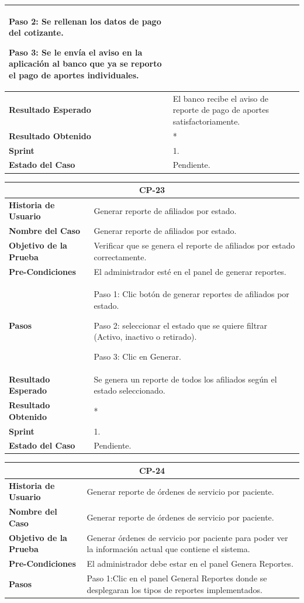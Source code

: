 \documentclass[12pt,a4paper]{article}
\begin{document}
\begin{center}
\begin{tabular}{|m{5cm}|m{9cm}|}
Paso 2: Se rellenan los datos de pago del cotizante.

Paso 3: Se le envía el aviso en la aplicación al banco que ya se reporto el pago de aportes individuales.\\
\hline
\textbf{Resultado Esperado} & El banco recibe el aviso de reporte de pago de aportes satisfactoriamente.\\
\hline
\textbf{Resultado Obtenido} & *\\
\hline
\textbf{Sprint} & 1. \\
\hline
\textbf{Estado del Caso} & Pendiente. \\
\hline
\end{tabular}
\vspace{5mm}

\begin{tabular}{|m{5cm}|m{9cm}|}
\hline
\multicolumn{2}{|c|}{\textbf{CP-23}} \\
\hline
\textbf{Historia de Usuario} & Generar reporte de afiliados por estado.\\
\hline
\textbf{Nombre del Caso} & Generar reporte de afiliados por estado.\\
\hline
\textbf{Objetivo de la Prueba} & Verificar que se genera el reporte de afiliados por estado correctamente.\\
\hline
\textbf{Pre-Condiciones} & El administrador esté en el panel de generar reportes. \\
\hline
\textbf{Pasos} & Paso 1: Clic botón de generar reportes de afiliados por estado.

Paso 2: seleccionar el estado que se quiere filtrar (Activo, inactivo o retirado).

Paso 3: Clic en Generar. \\
\hline
\textbf{Resultado Esperado} & Se genera un reporte de todos los afiliados según el estado seleccionado.\\
\hline
\textbf{Resultado Obtenido} & *\\
\hline
\textbf{Sprint} & 1. \\
\hline
\textbf{Estado del Caso} & Pendiente.\\
\hline
\end{tabular}
\vspace{5mm}

\begin{tabular}{|m{5cm}|m{9cm}|}
\hline
\multicolumn{2}{|c|}{\textbf{CP-24}} \\
\hline
\textbf{Historia de Usuario} & Generar reporte de órdenes de servicio por paciente.\\
\hline
\textbf{Nombre del Caso} & Generar reporte de órdenes de servicio por paciente. \\
\hline
\textbf{Objetivo de la Prueba} & Generar órdenes de servicio por paciente para poder ver la información actual que contiene el sistema. \\
\hline
\textbf{Pre-Condiciones} & El administrador debe estar en el panel Genera Reportes.\\
\hline
\textbf{Pasos} & Paso 1:Clic en el panel General Reportes donde se desplegaran los  tipos de reportes implementados.


\end{tabular}
\end{center}
\end{document}
